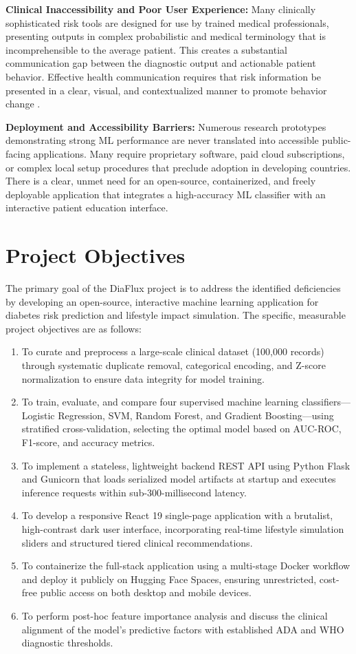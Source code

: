 \documentclass[12pt,a4paper]{report}
\begin{document}
\textbf{Clinical Inaccessibility and Poor User Experience:} Many clinically sophisticated risk tools are designed for use by trained medical professionals, presenting outputs in complex probabilistic and medical terminology that is incomprehensible to the average patient. This creates a substantial communication gap between the diagnostic output and actionable patient behavior. Effective health communication requires that risk information be presented in a clear, visual, and contextualized manner to promote behavior change \cite{who_dhi_report}.

\textbf{Deployment and Accessibility Barriers:} Numerous research prototypes demonstrating strong ML performance are never translated into accessible public-facing applications. Many require proprietary software, paid cloud subscriptions, or complex local setup procedures that preclude adoption in developing countries. There is a clear, unmet need for an open-source, containerized, and freely deployable application that integrates a high-accuracy ML classifier with an interactive patient education interface.

\section{Project Objectives}
The primary goal of the DiaFlux project is to address the identified deficiencies by developing an open-source, interactive machine learning application for diabetes risk prediction and lifestyle impact simulation. The specific, measurable project objectives are as follows:
\begin{enumerate}
    \item To curate and preprocess a large-scale clinical dataset (100,000 records) through systematic duplicate removal, categorical encoding, and Z-score normalization to ensure data integrity for model training.
    \item To train, evaluate, and compare four supervised machine learning classifiers---Logistic Regression, SVM, Random Forest, and Gradient Boosting---using stratified cross-validation, selecting the optimal model based on AUC-ROC, F1-score, and accuracy metrics.
    \item To implement a stateless, lightweight backend REST API using Python Flask and Gunicorn that loads serialized model artifacts at startup and executes inference requests within sub-300-millisecond latency.
    \item To develop a responsive React 19 single-page application with a brutalist, high-contrast dark user interface, incorporating real-time lifestyle simulation sliders and structured tiered clinical recommendations.
    \item To containerize the full-stack application using a multi-stage Docker workflow and deploy it publicly on Hugging Face Spaces, ensuring unrestricted, cost-free public access on both desktop and mobile devices.
    \item To perform post-hoc feature importance analysis and discuss the clinical alignment of the model's predictive factors with established ADA and WHO diagnostic thresholds.
\end{enumerate}
\end{document}

